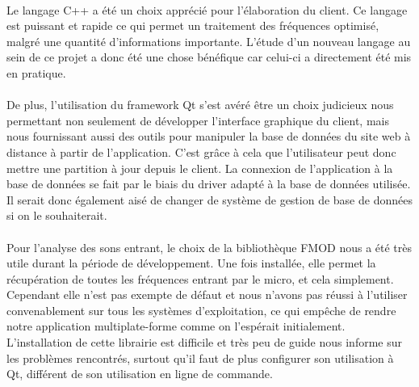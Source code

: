 \paragraph{}
Le langage C++ a été un choix apprécié pour l'élaboration du client. Ce langage est puissant et rapide ce qui permet un 
traitement des fréquences optimisé, malgré une quantité d'informations importante. L'étude d'un nouveau langage au sein 
de ce projet a donc été une chose bénéfique car celui-ci a directement été mis en pratique. 

\paragraph{}
De plus, l'utilisation du framework Qt s'est avéré être un choix judicieux nous permettant non seulement de développer l'interface graphique du client, mais nous fournissant aussi des outils pour manipuler la base de données du site web à distance à partir de l'application. C'est grâce à cela que l'utilisateur peut donc mettre une partition à jour depuis le client. La connexion de l'application à la base de données se fait par le biais du driver adapté 
à la base de données utilisée. Il serait donc également aisé de changer de système de gestion de base de données si on le souhaiterait. 

\paragraph{}
Pour l'analyse des sons entrant, le choix de la bibliothèque FMOD nous a été très utile durant la période de développement. Une fois installée, 
elle permet la récupération de toutes les fréquences entrant par le micro, et cela simplement. \\
Cependant elle n'est pas exempte de défaut et nous n'avons pas réussi à l'utiliser convenablement sur tous les systèmes d'exploitation, ce qui empêche de rendre notre application multiplate-forme comme on l'espérait initialement. L'installation de cette librairie est difficile et 
très peu de guide nous informe sur les problèmes rencontrés, surtout qu'il faut de plus configurer son utilisation à Qt, différent de son utilisation 
en ligne de commande. 

